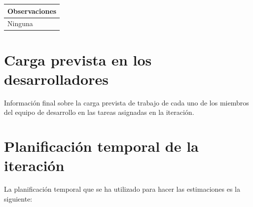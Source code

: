\documentclass[11pt]{article}
\begin{document}
\begin{longtable}{p{1.028\linewidth}}
	\textbf{Observaciones}\\
	\midrule
	Ninguna\\
	\bottomrule
	\bottomrule
\end{longtable}

\section{Carga prevista en los desarrolladores}

Información final sobre la carga prevista de trabajo de cada uno de los miembros del equipo de desarrollo en las tareas asignadas en la iteración.

\section{Planificación temporal de la iteración}
La planificación temporal que se ha utilizado para hacer las estimaciones es la siguiente:
\end{document}
